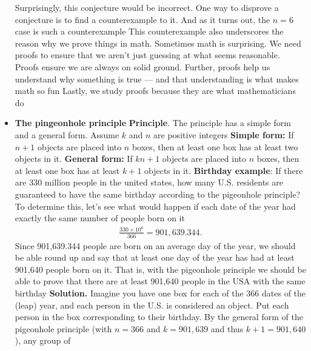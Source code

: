 \documentclass{report}
\begin{document}
\begin{itemize}
            \bigbreak \noindent 
            Surprisingly, this conjecture would be incorrect. One way to disprove a conjecture is to find a counterexample to it. And as it turns out, the $n = 6$ case is such a counterexample
            \bigbreak \noindent 
            \bigbreak \noindent 
            This counterexample also underscores the reason why we prove things in math. Sometimes math is surprising. We need proofs to ensure that we aren’t just guessing at what seems reasonable. Proofs ensure we are always on solid ground. Further, proofs help us understand why something is true — and that understanding is what makes math so fun
            \bigbreak \noindent 
            Lastly, we study proofs because they are what mathematicians do
        \item \textbf{The pingeonhole principle}
            \bigbreak \noindent 
            \textbf{Principle}. The principle has a simple form and a general form. Assume $k$ and $n$ are positive integers
            \bigbreak \noindent 
            \textbf{Simple form:} If $n + 1$ objects are placed into $n$ boxes, then at least one box has at least two objects in it.
            \bigbreak \noindent 
        \textbf{General form:} If $kn + 1$ objects are placed into $n$ boxes, then at least one box has at least $k + 1$ objects in it.
            \bigbreak \noindent 
            \textbf{Birthday example}: If there are 330 million people in the united states, how many U.S. residents are guaranteed to have the same birthday according to the pigeonhole principle?
            \bigbreak \noindent 
            To determine this, let’s see what would happen if each date of the year had exactly the same number of people born on it
            \begin{align*}
                \frac{330\times10^{6}}{366} = 901,639.344
            .\end{align*}
            \bigbreak \noindent 
            Since 901,639.344 people are born on an average day of the year, we should be able round up and say that at least one day of the year has had at least 901,640 people born on it. That is, with the pigeonhole principle we should be able to prove that there are at least 901,640 people in the USA with the same birthday
            \bigbreak \noindent 
            \textbf{Solution.} Imagine you have one box for each of the 366 dates of the (leap) year, and each person in the U.S. is considered an object. Put each person in the box corresponding to their birthday. By the general form of the pigeonhole principle (with $n = 366$ and $k = 901, 639$ and thus $k + 1 = 901, 640$), any group of

\end{itemize}
\end{document}
